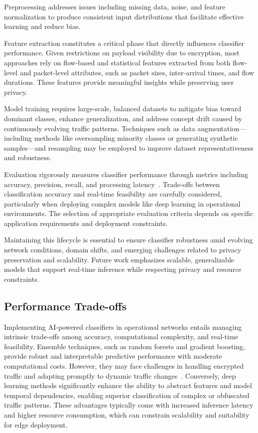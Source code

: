 \documentclass[sigconf]{acmart}
\begin{document}
Preprocessing addresses issues including missing data, noise, and feature normalization to produce consistent input distributions that facilitate effective learning and reduce bias.

Feature extraction constitutes a critical phase that directly influences classifier performance. Given restrictions on payload visibility due to encryption, most approaches rely on flow-based and statistical features extracted from both flow-level and packet-level attributes, such as packet sizes, inter-arrival times, and flow durations. These features provide meaningful insights while preserving user privacy.

Model training requires large-scale, balanced datasets to mitigate bias toward dominant classes, enhance generalization, and address concept drift caused by continuously evolving traffic patterns. Techniques such as data augmentation—including methods like oversampling minority classes or generating synthetic samples—and resampling may be employed to improve dataset representativeness and robustness.

Evaluation rigorously measures classifier performance through metrics including accuracy, precision, recall, and processing latency~\cite{ref51}. Trade-offs between classification accuracy and real-time feasibility are carefully considered, particularly when deploying complex models like deep learning in operational environments. The selection of appropriate evaluation criteria depends on specific application requirements and deployment constraints.

Maintaining this lifecycle is essential to ensure classifier robustness amid evolving network conditions, domain shifts, and emerging challenges related to privacy preservation and scalability. Future work emphasizes scalable, generalizable models that support real-time inference while respecting privacy and resource constraints.

\subsection{Performance Trade-offs}

Implementing AI-powered classifiers in operational networks entails managing intrinsic trade-offs among accuracy, computational complexity, and real-time feasibility. Ensemble techniques, such as random forests and gradient boosting, provide robust and interpretable predictive performance with moderate computational costs. However, they may face challenges in handling encrypted traffic and adapting promptly to dynamic traffic changes~\cite{ref51}. Conversely, deep learning methods significantly enhance the ability to abstract features and model temporal dependencies, enabling superior classification of complex or obfuscated traffic patterns. These advantages typically come with increased inference latency and higher resource consumption, which can constrain scalability and suitability for edge deployment.
\end{document}
